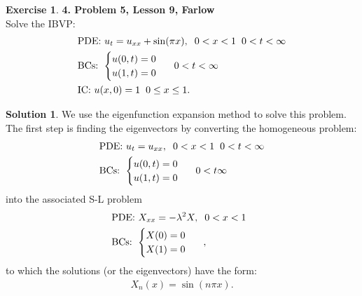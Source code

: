 \documentclass{book}
\theoremstyle{definition}
\newtheorem*{exer*}{Exercise}
\newtheorem*{sln*}{Solution}
\begin{document}
\begin{exer*}\textbf{4. Problem 5, Lesson 9, Farlow}\\
	
	Solve the IBVP:
	\begin{align*}
	&\text{PDE: } u_t = u_{xx} + \sin(\pi x), \hspace{0.2cm} 0 < x < 1\hspace{0.2cm} 0 < t < \infty\\
	&\text{BCs: }\begin{cases}
	u(0,t) = 0\\
	u(1,t) = 0
	\end{cases}\hspace{0.2cm} 0 < t < \infty\\
	&\text{IC: }u(x,0) = 1\hspace{0.2cm}0\leq x\leq 1.
	\end{align*}
	
	\begin{sln*}
		We use the eigenfunction expansion method to solve this problem. The first step is finding the eigenvectors by converting the homogeneous problem:
		\begin{align*}
		&\text{PDE: } u_t = u_{xx}, \hspace{0.2cm} 0 < x < 1\hspace{0.2cm} 0 < t < \infty\\
		&\text{BCs: }\begin{cases}
		u(0,t) = 0\\
		u(1,t) = 0
		\end{cases}\hspace{0.2cm} 0 < t  \infty
		\end{align*}
		into the associated S-L problem 
		\begin{align*}
		&\text{PDE: } X_{xx} = -\lambda^2 X, \hspace{0.2cm} 0 < x < 1\hspace{0.2cm}\\
		&\text{BCs: }\begin{cases}
		X(0) = 0\\
		X(1) = 0
		\end{cases}\hspace{0.2cm},
		\end{align*}
		to which the solutions (or the eigenvectors) have the form:
		\begin{align*}
		X_n(x) = \sin(n\pi x).
		\end{align*}
		

\end{sln*}
\end{exer*}
\end{document}
